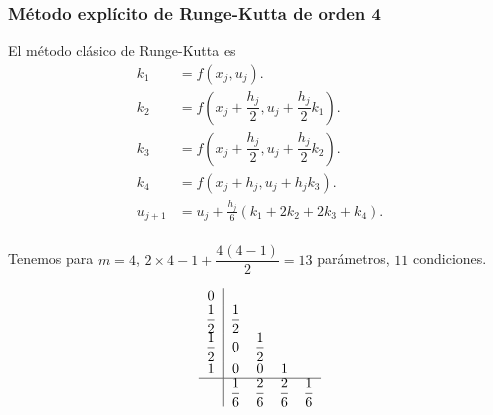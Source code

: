 

\begin{frame}
	\frametitle{Método explícito de Runge-Kutta de orden 4}
	El método clásico de Runge-Kutta es
	\begin{align*}
		k_{1}   & = f\left(x_{j},u_{j}\right).                                        \\
		k_{2}   & = f\left(x_{j}+\dfrac{h_{j}}{2},u_{j}+\dfrac{h_{j}}{2}k_{1}\right). \\
		k_{3}   & = f\left(x_{j}+\dfrac{h_{j}}{2},u_{j}+\dfrac{h_{j}}{2}k_{2}\right). \\
		k_{4}   & = f\left(x_{j}+h_{j},u_{j}+h_{j}k_{3}\right).                       \\
		u_{j+1} & = u_{j}+\frac{h_{j}}{6}\left(k_{1}+2k_{2}+2k_{3}+k_{4}\right).      \\
	\end{align*}

	Tenemos para $m=4$, $2\times 4-1+\dfrac{4\left(4-1\right)}{2}=13$
	parámetros, $11$ condiciones.

	\begin{equation*}
		\begin{array}
			{c|cccc}
			0                                                                        \\
			\dfrac{1}{2} & \dfrac{1}{2}                                              \\
			\dfrac{1}{2} & 0            & \dfrac{1}{2}                               \\
			1            & 0            & 0            & 1                           \\
			\hline
			             & \dfrac{1}{6} & \dfrac{2}{6} & \dfrac{2}{6} & \dfrac{1}{6}
		\end{array}
	\end{equation*}
\end{frame}